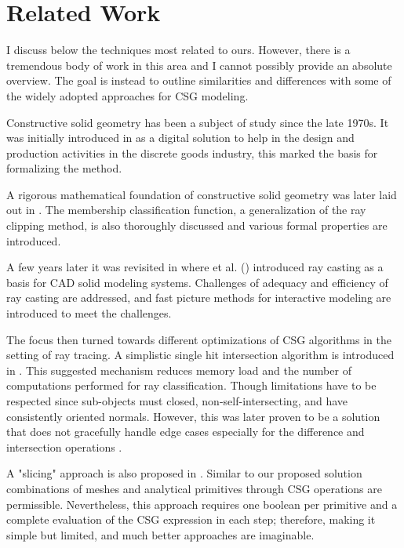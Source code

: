 \documentclass[a4paper,11pt,oneside]{article}
\begin{document}
  
\section{Related Work}
  
I discuss below the techniques most related to ours. However, there is a tremendous body of work in this area and I cannot possibly provide an absolute overview. The goal is instead to outline similarities and differences with some of the widely adopted approaches for CSG modeling.

Constructive solid geometry has been a subject of study since the late 1970s. It was initially introduced in \cite{GEOMETRIC_MODELING_1977} as a digital solution to help in the design and production activities in the discrete goods industry, this marked the basis for formalizing the method.
  
A rigorous mathematical foundation of constructive solid geometry was later laid out in \cite{Requicha1978MathematicalFO}. The membership classification function, a generalization of the ray clipping method, is also thoroughly discussed and various formal properties are introduced.
  
A few years later it was revisited in \cite{ROTH1982109} where \citeauthor{ROTH1982109} et al. (\citeyear{ROTH1982109}) introduced ray casting as a basis for CAD solid modeling systems. Challenges of adequacy and efficiency of ray casting are addressed, and fast picture methods for interactive modeling are introduced to meet the challenges.
  
The focus then turned towards different optimizations of CSG algorithms in the setting of ray tracing. A simplistic single hit intersection algorithm is introduced in \cite{kensler_ray_2006}. This suggested mechanism reduces memory load and the number of computations performed for ray classification. Though limitations have to be respected since sub-objects must closed, non-self-intersecting, and have consistently oriented normals. However, this was later proven to be a solution that does not gracefully handle edge cases especially for the difference and intersection operations \cite{csg-xrt-renderer}.
  
A "slicing" approach is also proposed in \cite{lefebvre:hal-00926861}. Similar to our proposed solution combinations of meshes and analytical primitives through CSG operations are permissible. Nevertheless, this approach requires one boolean per primitive and a complete evaluation of the CSG expression in each step; therefore, making it simple but limited, and much better approaches are imaginable.
\end{document}
